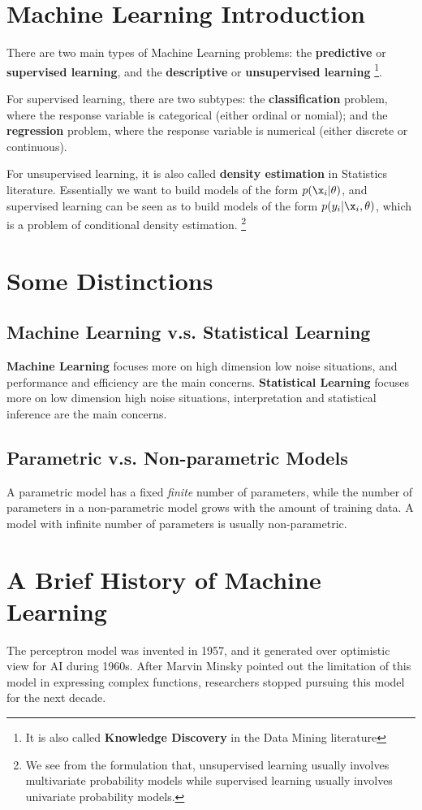 \section{Machine Learning Introduction}
There are two main types of Machine Learning problems: the {\bf{predictive}} or {\bf{supervised learning}}, and the {\bf{descriptive}} or {\bf{unsupervised learning}} \footnote{It is also called {\bf{Knowledge Discovery}} in the Data Mining literature}.

For supervised learning, there are two subtypes: the {\bf{classification}} problem, where the response variable is categorical (either ordinal or nomial); and the {\bf{regression}} problem, where the response variable is numerical (either discrete or continuous).

For unsupervised learning, it is also called {\bf{density estimation}} in Statistics literature. Essentially we want to build models of the form $p(\x_i|\theta)$, and supervised learning can be seen as to build models of the form $p(y_i|\x_i,\theta)$, which is a problem of conditional density estimation. \footnote{We see from the formulation that, unsupervised learning usually involves multivariate probability models while supervised learning usually involves univariate probability models.}


\section{Some Distinctions}
\subsection{Machine Learning v.s. Statistical Learning}
{\bf{Machine Learning}} focuses more on high dimension low noise situations, and performance and efficiency are the main concerns. {\bf{Statistical Learning}} focuses more on low dimension high noise situations, interpretation and statistical inference are the main concerns.
\subsection{Parametric v.s. Non-parametric Models}
A parametric model has a fixed {\em{finite}} number of parameters, while the number of parameters in a non-parametric model grows with the amount of training data. A model with infinite number of parameters is usually non-parametric.

\section{A Brief History of Machine Learning}
The perceptron model was invented in 1957, and it generated over optimistic view for AI during 1960s. After Marvin Minsky pointed out the limitation of this model in expressing complex functions, researchers stopped pursuing this model for the next decade.

